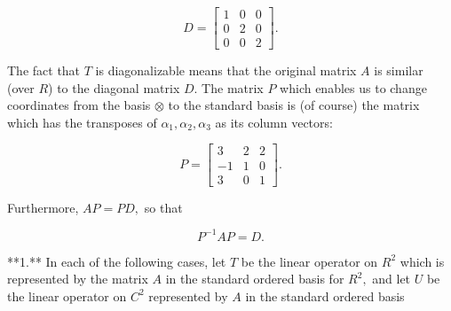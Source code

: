 \[D=\left[\begin{matrix}1&0&0\\ 0&2&0\\ 0&0&2\end{matrix}\right].\]

The fact that \(T\) is diagonalizable means that the original matrix \(A\) is similar (over \(R\)) to the diagonal matrix \(D.\) The matrix \(P\) which enables us to change coordinates from the basis \(\otimes\) to the standard basis is (of course) the matrix which has the transposes of \(\alpha_{1},\)\(\alpha_{2},\)\(\alpha_{3}\) as its column vectors:

\[P=\left[\begin{matrix}3&2&2\\ -1&1&0\\ 3&0&1\end{matrix}\right].\]

Furthermore, \(AP=PD,\) so that

\[P^{-1}AP=D.\]

**1.** In each of the following cases, let \(T\) be the linear operator on \(R^{2}\) which is represented by the matrix \(A\) in the standard ordered basis for \(R^{2},\) and let \(U\) be the linear operator on \(C^{2}\) represented by \(A\) in the standard ordered basis 